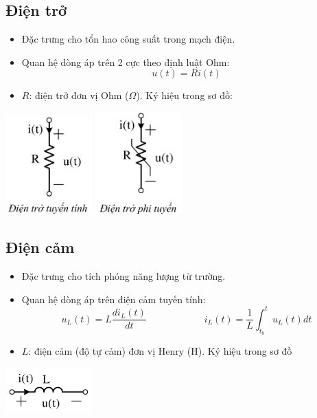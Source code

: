 \subsection{Điện trở}
\begin{itemize}
  \item Đặc trưng cho tổn hao công suất trong mạch điện.
  \item Quan hệ dòng áp trên 2 cực theo định luật Ohm:
    \begin{equation}
      u(t) = Ri(t)
    \end{equation}
  \item $R$: điện trở đơn vị Ohm ($\Omega$). Ký hiệu trong sơ đồ:
\end{itemize}
\begin{center}
  \includegraphics[width=0.25\textwidth]{./image/3.png} \quad \quad \quad \includegraphics[width=0.25\textwidth]{./image/4.png}
\end{center}
\subsection{Điện cảm}
\begin{itemize}
  \item Đặc trưng cho tích phóng năng lượng từ trường.
  \item Quan hệ dòng áp trên điện cảm tuyến tính:
  \begin{equation}
    u_L(t) = L\frac{di_L(t)}{dt} \hspace{1in} i_L(t)=\frac{1}{L}\int_{t_0}^{t} u_L(t)dt 
  \end{equation}
  \item $L$: điện cảm (độ tự cảm) đơn vị Henry (H). Ký hiệu trong sơ đồ
\end{itemize}
\begin{center}
  \includegraphics[width=0.25\textwidth]{./image/5.png}
\end{center}
